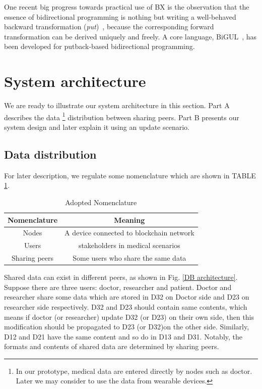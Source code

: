 \documentclass[conference]{IEEEtran}
\begin{document}
	One recent big progress towards practical use of BX is the observation that the essence of bidirectional programming is nothing but writing a well-behaved backward transformation (\emph{put})~\cite{hu2014validity, pacheco2014monadic, pacheco2014biflux}, because the corresponding forward transformation can be derived uniquely and freely. A core language, BiGUL~\cite{bigul}, has been developed for putback-based bidirectional programming.
    
\section{System architecture}
\label{system}
     We are ready to illustrate our system architecture in this section. Part A describes the data \footnote{In our prototype, medical data are entered directly by nodes such as doctor. Later we may consider to use the data from wearable devices.} distribution between sharing peers. Part B presents our system design and later explain it using an update scenario.

\subsection{Data distribution}

For later description, we regulate some nomenclature which are shown in TABLE \ref{nomenclature}.

\begin{table}[htbp]
	\caption{Adopted Nomenclature}
	\begin{center}
		\begin{tabular}{c|c}
	    \hline
	    Nomenclature & Meaning \\
	    \hline
		Nodes & A device connected to blockchain network  \\
		Users &   stakeholders in medical scenarios\\ 
	    Sharing peers &  Some users who share the same data  \\
		\hline
		\end{tabular}
		\label{nomenclature}
	\end{center}
\end{table}

Shared data can exist in different peers, as shown in Fig. \ref{DB architecture}. Suppose there are three users: doctor, researcher and patient. Doctor and researcher share some data which are stored in D32 on Doctor side and D23 on researcher side respectively. D32 and D23 should contain same contents, which means if doctor (or researcher) update D32 (or D23) on their own side, then this modification should be propagated to D23 (or D32)on the other side. Similarly, D12 and D21 have the same content and so do in D13 and D31. Notably, the formats and contents of shared data are determined by sharing peers. %
\end{document}
